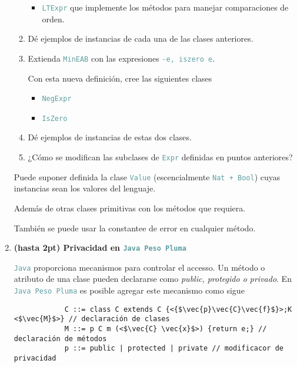 \documentclass{article}
\newcommand{\tx}[1]{\textcolor{CadetBlue} {\texttt{#1}}}
\newcommand{\tb}[1]{\textcolor{RoyalPurple} {\textbf{#1}}}
\newcommand{\ti}[1]{\textcolor{RoyalPurple} {\textit{#1}}}
\newcommand{\pt}[1]{\textcolor{RoyalPurple}{(#1pt)}}
\begin{document}
\begin{enumerate}
\begin{enumerate}
\begin{itemize}
                \item \tx{LTExpr} que implemente los métodos para manejar 
                comparaciones de orden.
            \end{itemize}

            \item Dé ejemplos de instancias de cada una de las clases 
            anteriores.

            \item Extienda \tx{MinEAB} con las expresiones \tx{-e, iszero e}.

            Con esta nueva definición, cree las siguientes clases

            \begin{itemize}
                \item \tx{NegExpr}
                \item \tx{IsZero}
            \end{itemize}

            \item Dé ejemplos de instancias de estas dos clases.

            \item ¿Cómo se modifican las subclases de \tx{Expr} definidas en
            puntos anteriores?
        \end{enumerate}

        Puede suponer definida la clase \tx{Value} (escencialmente 
        \tx{Nat + Bool}) cuyas instancias sean los valores del lenguaje.

        Además de otras clases primitivas con los métodos que requiera.

        También se puede usar la constantee de error en cualquier método.

        \item \tb{\pt{hasta 2} Privacidad en \tx{Java Peso Pluma}}

        \tx{Java} proporciona mecanismos para controlar el accesso. Un método o
        atributo de una clase pueden declararse como \ti{public, protegido o 
        privado}. En \tx{Java Peso Pluma} es posible agregar este mecanismo como
        sigue

        \begin{verbatim}
            C ::= class C extends C {<{$\vec{p}\vec{C}\vec{f}$}>;K <$\vec{M}$>} // declaración de clases
            M ::= p C m (<$\vec{C} \vec{x}$>) {return e;} // declaración de métodos
            p ::= public | protected | private // modificacor de privacidad
        \end{verbatim}


\end{enumerate}
\end{document}
